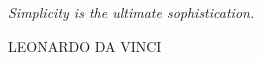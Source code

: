 
\clearpage

\thispagestyle{empty}
\null\vfill

\settowidth{}

\parbox{\longest}{%
  \raggedright{\Large\itshape%
  	Simplicity is the ultimate sophistication.\par\bigskip
  }   
  \raggedleft\large\MakeUppercase{Leonardo da Vinci}\par%
}

\vfill\vfill

\clearpage
